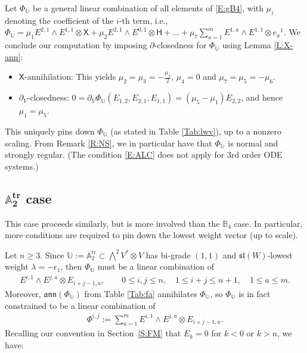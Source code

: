 \documentclass[10pt,a4paper]{amsart}
\newcommand\tensor{\otimes}
\DeclareMathOperator{\tr}{tr}
\newcommand\fann{\mathfrak{ann}}
\newcommand\fsl{\mathfrak{sl}}
\newcommand\bbU{\mathbb{U}}
\newcommand\bbA{\mathbb{A}}
\newcommand\bbB{\mathbb{B}}
\newcommand\sfX{\mathsf{X}}
\newcommand\sfH{\mathsf{H}}
\numberwithin{equation}{section}
\begin{document}
Let $\Phi_{\bbU}$ be a general linear combination of all elements of \eqref{E:gB4}, with $\mu_i$ denoting the coefficient of the $i$-th term, i.e., $\Phi_{\bbU} = \mu_1 E^{2,1} \wedge E^{1,1} \tensor \sfX + \mu_2 E^{2,1} \wedge E^{0,1} \tensor \sfH + \dots + \mu_7 \sum_{a=1}^m E^{1,a} \wedge E^{1,1} \tensor e_a{}^1$. We conclude our computation by imposing $\partial$-closedness for $\Phi_{\bbU}$ using
Lemma \ref{L:X-ann}:
 \begin{itemize}\itemsep=0pt
 \item $\sfX$-annihilation: This yields $\mu_2 = \mu_3 = -\frac{\mu_1}{2}$,
$\mu_4 = 0$ and $\mu_7 =\mu_5= -\mu_6$.
 \item $\partial_V$-closedness: $0=\partial_V\Phi_{\bbU}(E_{1,2},E_{2,1},E_{1,1}) = (\mu_5-\mu_1)E_{2,2}$, and hence $\mu_1 = \mu_5$.
 \end{itemize}
 This uniquely pins down $\Phi_{\bbU}$ (as stated in Table \ref{Tab:lwv}), up to a nonzero scaling. From Remark \ref{R:NS}, we in particular have that $\Phi_{\bbU}$ is normal and strongly regular. (The condition \eqref{E:ALC} does not apply for 3rd order ODE systems.)

\subsection[A\_2\^{}\{tr\} case]{$\boldsymbol{\bbA_2^{\tr}}$ case}
\label{S:Phitr}
This case proceeds similarly, but is more involved than the $\bbB_4$ case. In particular, more conditions are required to pin down the lowest weight vector (up to scale).

Let $n \geq 3$. Since $\bbU := \bbA_2^{\tr} \subset \bigwedge^2 V^* \otimes V$ has bi-grade $(1,1)$ and $\fsl(W)$-lowest weight $\lambda = -\epsilon_1$, then $\Phi_\bbU$ must be a linear combination of
\begin{align*}%
E^{i,1} \wedge E^{j,a} \tensor E_{i+j-1,a}, \qquad 0 \le i, j \le n, \quad 1 \le i+j \le n+1,\quad 1 \le a \le m.
\end{align*}
Moreover, $\fann(\Phi_{\bbU})$ from Table \ref{Tab:fa} annihilates $\Phi_\bbU$, so $\Phi_{\bbU}$ is in fact constrained to be a linear combination of
\begin{align} \label{E:Phi_ij}
\Phi^{i,j} := \sum_{a=1}^m E^{i,1}\wedge E^{j,a}\tensor E_{i+j-1,a}.
\end{align}
Recalling our convention in Section~\ref{S:FM} that $E_k = 0$ for $k < 0$ or $k > n$, we have:
\end{document}

